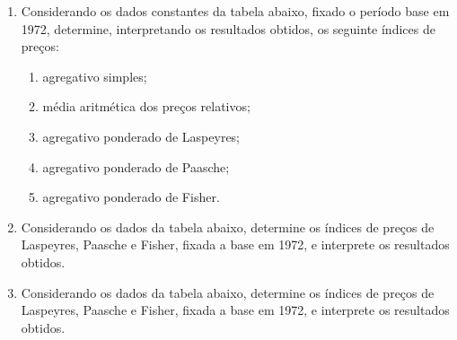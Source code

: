 \begin{enumerate}[resume]
\item Considerando os dados constantes da tabela abaixo, fixado o período base em 1972, determine, interpretando os resultados obtidos, os seguinte índices de preços:
	\begin{enumerate}
	\item agregativo simples;
	\item média aritmética dos preços relativos;
	\item agregativo ponderado de Laspeyres;
	\item	 agregativo ponderado de Paasche;
	\item agregativo ponderado de Fisher.
	\end{enumerate}

\item Considerando os dados da tabela abaixo, determine os índices de preços de Laspeyres, Paasche e Fisher, fixada a base em 1972, e interprete os resultados obtidos.


\item Considerando os dados da tabela abaixo, determine os índices de preços de Laspeyres, Paasche e Fisher, fixada a base em 1972, e interprete os resultados obtidos.


\end{enumerate}